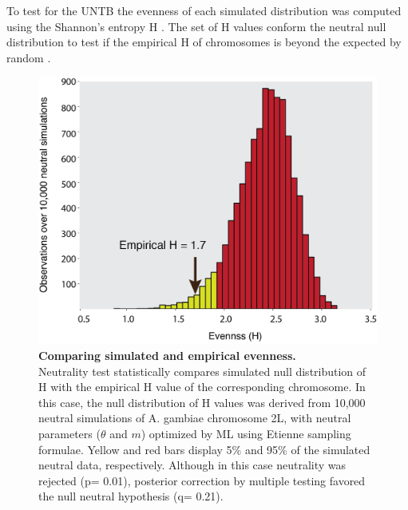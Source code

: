 To test for the UNTB the evenness of each simulated distribution was computed using the Shannon's entropy H \cite{Jabot2011}. The set of H values conform the neutral null distribution to test if the empirical H of chromosomes is beyond the expected by random .


\begin{figure}[htpb]
\centering 
\includegraphics[width=\textwidth]{tex_source/figures/untb_genomes/shannon_distrib.png}
\caption[Comparing simulated and empirical evenness.]{{\bf Comparing simulated and empirical evenness. }\\Neutrality test statistically compares simulated null distribution of H with the empirical H value of the corresponding chromosome. In this case, the null distribution of H values was derived from 10,000 neutral simulations of A. gambiae chromosome 2L, with neutral parameters ($\theta$ and $m$) optimized by ML using Etienne sampling formulae. Yellow and red bars display 5\% and 95\% of the simulated neutral data, respectively. Although in this case neutrality was rejected (p= 0.01), posterior correction by multiple testing favored the null neutral hypothesis (q= 0.21).}
\label{fig:shannon_distrib}
\end{figure}



